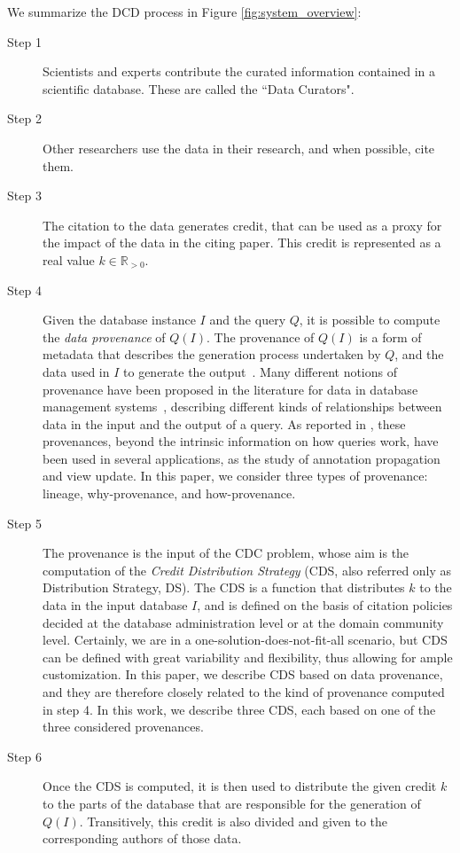 We summarize the DCD process in Figure \ref{fig:system_overview}:
\begin{description}
	\item[Step 1] Scientists and experts contribute 
	the curated information contained in a scientific database.  These are called the ``Data Curators".  
	
	\item[Step 2] Other researchers use the data in their research, and when possible, cite them. 
	\item[Step 3] The citation to the data generates credit, that can be used as a proxy for the impact of the data in the citing paper. This credit is represented as a real value $k \in \mathbb{R}_{>0}$. 
	\item[Step 4] Given the database instance $I$ and the query $Q$, it is possible to compute the \emph{data provenance} of $Q(I)$. The provenance of $Q(I)$ is a form of metadata that describes the generation process undertaken by $Q$, and the data used in $I$ to generate the output~\citep{CheneyProvSurvey}. Many different notions of provenance have been proposed in the literature for data in database management systems~\citep{lineageCui, WhyProvBuneman, howProvenanceGreen}, describing different kinds of relationships between data in the input and the output of a query. As reported in \citep{CheneyProvSurvey}, these provenances, beyond the intrinsic information on how queries work, have been used in several applications, as the study of annotation propagation and view update. In this paper, we consider three types of provenance: lineage, why-provenance, and how-provenance. %
	\item[Step 5] The provenance is the input of the CDC problem, whose aim is the computation of the \emph{Credit Distribution Strategy} (CDS, also referred only as Distribution Strategy, DS). The CDS is a function that distributes $k$ to the data in the input database $I$, and is defined on the basis of citation policies decided at the database administration level or at the domain community level.
	Certainly, we are in a one-solution-does-not-fit-all scenario, but CDS can be defined with great variability and flexibility, thus allowing for ample customization. 
	In this paper, we describe CDS based on data provenance, and they are therefore closely related to the kind of provenance computed in step 4. In this work, we describe three CDS, each based on one of the three considered provenances.
	\item[Step 6] Once the CDS is computed, it is then used to distribute the given credit $k$ to the parts of the database that are responsible for the generation of $Q(I)$. Transitively, this credit is also divided and given to the corresponding authors of those data.
\end{description}

